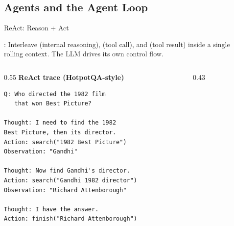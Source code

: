 \subsection{Agents and the Agent Loop}

\begin{frame}[fragile]{ReAct: Reason + Act}

  \cite{yao2023react}: Interleave  (internal reasoning),
   (tool call), and  (tool result) inside a single
  rolling context. The LLM drives its own control flow.

  \vspace{0.3em}
  \begin{columns}
    \begin{column}{0.55\textwidth}
      {\scriptsize\textbf{ReAct trace (HotpotQA-style)}}
\begin{lstlisting}[basicstyle=\scriptsize\ttfamily, frame=single, backgroundcolor=\color{blue!3}, rulecolor=\color{blue!50!black}, keywordstyle={}, commentstyle={}, stringstyle={}, xleftmargin=0.3em, xrightmargin=0.3em, mathescape=false]
Q: Who directed the 1982 film
   that won Best Picture?

Thought: I need to find the 1982
Best Picture, then its director.
Action: search("1982 Best Picture")
Observation: "Gandhi"

Thought: Now find Gandhi's director.
Action: search("Gandhi 1982 director")
Observation: "Richard Attenborough"

Thought: I have the answer.
Action: finish("Richard Attenborough")
\end{lstlisting}
    \end{column}
    \begin{column}{0.43\textwidth}
      \begin{center}
\end{center}
\end{column}
\end{columns}
\end{frame}
